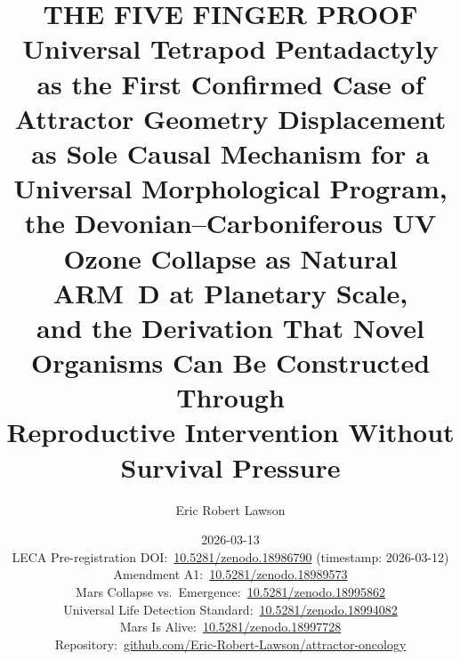 \documentclass[11pt, a4paper]{article}
\begin{document}
\title{
  \large\bfseries\color{headerblue}
  THE FIVE FINGER PROOF\\[0.4em]
  \normalsize\color{headerblue}
  Universal Tetrapod Pentadactyly as the First
  Confirmed Case of Attractor Geometry Displacement\\
  as Sole Causal Mechanism for a Universal
  Morphological Program,\\
  the Devonian--Carboniferous UV Ozone Collapse
  as Natural ARM~D at Planetary Scale,\\
  and the Derivation That Novel Organisms Can Be
  Constructed Through\\
  Reproductive Intervention Without Survival Pressure
}

\author[1]{Eric Robert Lawson}

\date{2026-03-13\\[0.3em]
  \footnotesize
  LECA Pre-registration DOI:\
  \href{https://doi.org/10.5281/zenodo.18986790}
  {10.5281/zenodo.18986790}
  (timestamp: 2026-03-12)\\
  Amendment A1:\
  \href{https://doi.org/10.5281/zenodo.18989573}
  {10.5281/zenodo.18989573}\\
  Mars Collapse vs.\ Emergence:\
  \href{https://doi.org/10.5281/zenodo.18995862}
  {10.5281/zenodo.18995862}\\
  Universal Life Detection Standard:\
  \href{https://doi.org/10.5281/zenodo.18994082}
  {10.5281/zenodo.18994082}\\
  Mars Is Alive:\
  \href{https://doi.org/10.5281/zenodo.18997728}
  {10.5281/zenodo.18997728}\\
  Repository:\
  \href{https://github.com/Eric-Robert-Lawson/attractor-oncology}
  {github.com/Eric-Robert-Lawson/attractor-oncology}
}

\maketitle
\thispagestyle{empty}
\end{document}
